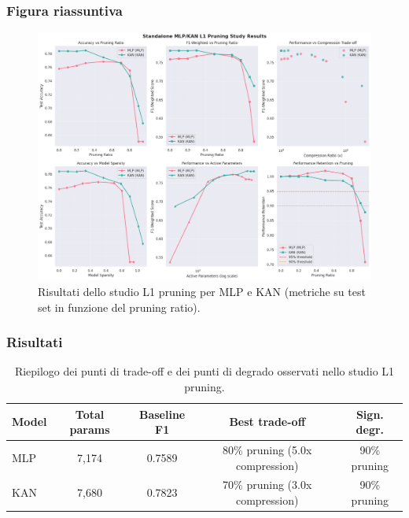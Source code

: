 \documentclass[a4paper,12pt]{report}
\begin{document}
	\subsubsection{Figura riassuntiva}
	\begin{figure}[H]
		\centering
		\includegraphics[width=1.0\textwidth]{img/abl_kanvsmlp_pm.png}
		\caption{Risultati dello studio L1 pruning per MLP e KAN (metriche su test set in funzione del pruning ratio).}
	\end{figure}
	
	\subsubsection{Risultati}
	\begin{table}[H]
		\centering
		\setlength{\tabcolsep}{4pt}
		\begin{tabular}{lcccc}
			\toprule
			\textbf{Model} & \textbf{Total params} & \textbf{Baseline F1} & \textbf{Best trade-off} & \textbf{Sign. degr.} \\
			\midrule
			MLP & 7,174   & 0.7589 & 80\% pruning (5.0x compression) & 90\% pruning \\
			KAN & 7,680   & 0.7823 & 70\% pruning (3.0x compression) & 90\% pruning \\
			\bottomrule
		\end{tabular}
		\caption{Riepilogo dei punti di trade-off e dei punti di degrado osservati nello studio L1 pruning.}
	\end{table}
	
\end{document}
